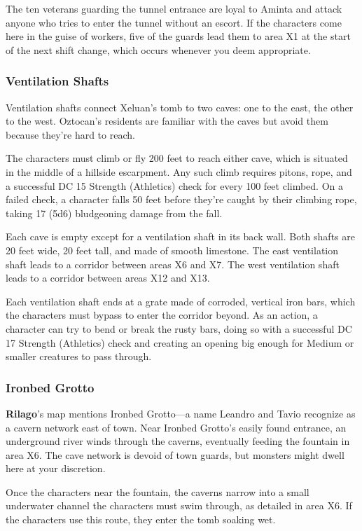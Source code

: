 \documentclass[10pt,a4paper,twoside,bg=print,twocolumn,openany,nodeprecatedcode]{dndbook}
\begin{document}
The ten veterans guarding the tunnel entrance are loyal to Aminta and attack anyone who tries to enter the tunnel without an escort. If the characters come here in the guise of workers, five of the guards lead them to area X1 at the start of the next shift change, which occurs whenever you deem appropriate.

\subsubsection{Ventilation Shafts}
Ventilation shafts connect Xeluan's tomb to two caves: one to the east, the other to the west. Oztocan's residents are familiar with the caves but avoid them because they're hard to reach.

The characters must climb or fly 200 feet to reach either cave, which is situated in the middle of a hillside escarpment. Any such climb requires pitons, rope, and a successful DC 15 Strength (Athletics) check for every 100 feet climbed. On a failed check, a character falls 50 feet before they're caught by their climbing rope, taking 17 (5d6) bludgeoning damage from the fall.

Each cave is empty except for a ventilation shaft in its back wall. Both shafts are 20 feet wide, 20 feet tall, and made of smooth limestone. The east ventilation shaft leads to a corridor between areas X6 and X7. The west ventilation shaft leads to a corridor between areas X12 and X13.

Each ventilation shaft ends at a grate made of corroded, vertical iron bars, which the characters must bypass to enter the corridor beyond. As an action, a character can try to bend or break the rusty bars, doing so with a successful DC 17 Strength (Athletics) check and creating an opening big enough for Medium or smaller creatures to pass through.

\subsubsection{Ironbed Grotto}
\textbf{Rilago}'s map mentions Ironbed Grotto—a name Leandro and Tavio recognize as a cavern network east of town. Near Ironbed Grotto's easily found entrance, an underground river winds through the caverns, eventually feeding the fountain in area X6. The cave network is devoid of town guards, but monsters might dwell here at your discretion.

Once the characters near the fountain, the caverns narrow into a small underwater channel the characters must swim through, as detailed in area X6. If the characters use this route, they enter the tomb soaking wet.
\end{document}
